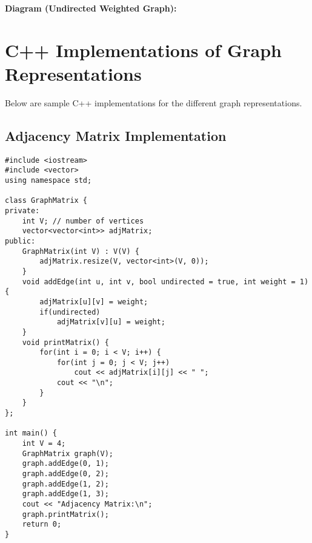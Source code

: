 \textbf{Diagram (Undirected Weighted Graph):}
\begin{center}
\end{center}

\section{C++ Implementations of Graph Representations}
Below are sample C++ implementations for the different graph representations.

\subsection{Adjacency Matrix Implementation}
\begin{lstlisting}[caption={C++ implementation using an Adjacency Matrix}]
#include <iostream>
#include <vector>
using namespace std;

class GraphMatrix {
private:
    int V; // number of vertices
    vector<vector<int>> adjMatrix;
public:
    GraphMatrix(int V) : V(V) {
        adjMatrix.resize(V, vector<int>(V, 0));
    }
    void addEdge(int u, int v, bool undirected = true, int weight = 1) {
        adjMatrix[u][v] = weight;
        if(undirected)
            adjMatrix[v][u] = weight;
    }
    void printMatrix() {
        for(int i = 0; i < V; i++) {
            for(int j = 0; j < V; j++)
                cout << adjMatrix[i][j] << " ";
            cout << "\n";
        }
    }
};

int main() {
    int V = 4;
    GraphMatrix graph(V);
    graph.addEdge(0, 1);
    graph.addEdge(0, 2);
    graph.addEdge(1, 2);
    graph.addEdge(1, 3);
    cout << "Adjacency Matrix:\n";
    graph.printMatrix();
    return 0;
}
\end{lstlisting}

